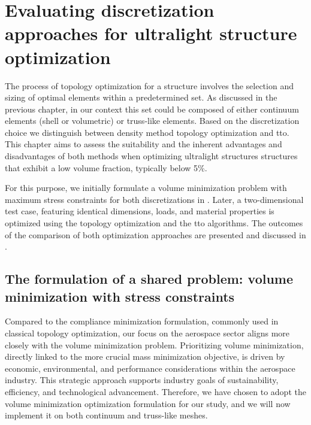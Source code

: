 \setchapterpreamble[u]{\margintoc}
\glsresetall %
\chapter{Evaluating discretization approaches for ultralight structure optimization}
The process of topology optimization for a structure involves the selection and sizing of optimal elements within a predetermined set. As discussed in the previous chapter, in our context this set could be composed of either continuum elements (shell or volumetric) or truss-like elements. Based on the discretization choice we distinguish between density method topology optimization and \gls{tto}. This chapter aims to assess the suitability and the inherent advantages and disadvantages of both methods when optimizing ultralight structures \ie structures that exhibit  a low volume fraction, typically below 5\%. 

For this purpose, we initially formulate a volume minimization problem with maximum stress constraints for both discretizations in . Later, a two-dimensional test case, featuring identical dimensions, loads, and material properties is optimized using the topology optimization and the \gls{tto} algorithms. The outcomes of the comparison of both optimization approaches are presented and discussed in . 

\section{The formulation of a shared problem: volume minimization with stress constraints} \label{sec:03_common_prob}
Compared to the compliance minimization formulation, commonly used in classical topology optimization, our focus on the aerospace sector aligns more closely with the volume minimization problem. Prioritizing volume minimization, directly linked to the more crucial mass minimization objective, is driven by economic, environmental, and performance considerations within the aerospace industry. This strategic approach supports industry goals of sustainability, efficiency, and technological advancement. Therefore, we have chosen to adopt the volume minimization optimization formulation for our study, and we will now implement it on both continuum and truss-like meshes.

